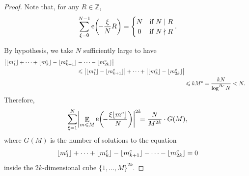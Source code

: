 \documentclass[letterpaper, 12pt]{article}
\theoremstyle{plain}
\theoremstyle{definition}
\theoremstyle{plain}
\theoremstyle{plain}
\numberwithin{equation}{section}
\newcommand{\Z}{\mathbb{Z}}
\renewcommand{\leq}{\leqslant}
\newcommand{\E}{\mathbb{E}}
\newcommand{\1}{\textbf{1}}
\DeclarePairedDelimiter\floor{\lfloor}{\rfloor}
\DeclareMathOperator{\e}{e}
\begin{document}
\begin{proof}
    Note that, for any $R \in \Z$,
    \begin{equation*}
      \sum_{\xi = 0}^{N - 1} \e\biggl(\! -\frac{\xi}{N} R \biggr) 
      =\begin{cases}
            N &\text{if } N \mid R\\
            \hfil 0 &\text{if } N \nmid R
        \end{cases}.
    \end{equation*}
    
    By hypothesis, we take \(N\) sufficiently large to have
    \begin{align*}
        \begin{split}
            \bigl\lvert \floor{m_1^c} + \cdots + \floor{m_k^c} - \floor{m_{k + 1}^c} &- \cdots - \floor{m_{2k}^c} \bigr\rvert\\
            &\leq \bigl\lvert \floor{m_1^c} - \floor{m_{k + 1}^c} \bigr\rvert + \cdots + \bigl\lvert \floor{m_k^c} - \floor{m_{2k}^c} \bigr\rvert
        \end{split}\\
        &\leq k M^c = \frac{kN}{\log^{Bc} N} < N.
    \end{align*}
    Therefore,
    \begin{equation*}
        \sum_{\xi = 1}^{N} \biggl\lvert \mathop{\E}_{m \leq M} \e\biggl(\! -\frac{\xi \floor{m^c}}{N} \biggr) \biggr\rvert^{2k} 
        \!\!\! = \frac{N}{M^{2k}} \cdot G(M),
    \end{equation*}
    where $G(M)$ is the number of solutions to the equation 
    \begin{equation}\label{eqn:2k-dim-cube}
        \floor{m_1^c} + \cdots + \floor{m_k^c} - \floor{m_{k + 1}^c} - \cdots - \floor{m_{2k}^c} = 0
    \end{equation}
    inside the $2k$-dimensional cube $\{1, \ldots , M\}^{2k}$. 


\end{proof}
\end{document}
